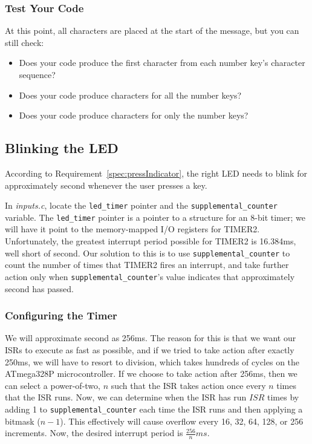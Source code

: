 \subsubsection{Test Your Code}

At this point, all characters are placed at the start of the message, but you can still check:
\begin{itemize}
    \item Does your code produce the first character from each number key's character sequence?
    \item Does your code produce characters for all the number keys?
    \item Does your code produce characters for only the number keys?
\end{itemize}


\subsection{Blinking the LED} \label{subsec:blinking}

According to Requirement~\ref{spec:pressIndicator}, the right LED needs to blink for approximately \textonequarter second whenever the user presses a key.

In \textit{inputs.c}, locate the \lstinline{led_timer} pointer and the \lstinline{supplemental_counter} variable.
The \lstinline{led_timer} pointer is a pointer to a structure for an 8-bit timer;
we will have it point to the memory-mapped I/O registers for TIMER2.
Unfortunately, the greatest interrupt period possible for TIMER2 is 16.384ms, well short of \textonequarter second.
Our solution to this is to use \lstinline{supplemental_counter} to count the number of times that TIMER2 fires an interrupt,
and take further action only when \lstinline{supplemental_counter}'s value indicates that approximately \textonequarter second has passed.

\subsubsection{Configuring the Timer}

We will approximate \textonequarter second as 256ms.
The reason for this is that we want our ISRs to execute as fast as possible, and if we tried to take action after exactly 250ms, we will have to resort to division, which takes hundreds of cycles on the ATmega328P microcontroller.
If we choose to take action after 256ms, then we can select a power-of-two, $n$ such that the ISR takes action once every $n$ times that the ISR runs.
Now, we can determine when the ISR has run $ISR$ times by adding 1 to \lstinline{supplemental_counter} each time the ISR runs and then applying a bitmask ($n-1$).
This effectively will cause overflow every 16, 32, 64, 128, or 256 increments.
Now, the desired interrupt period is $\frac{256}{n}ms$.

